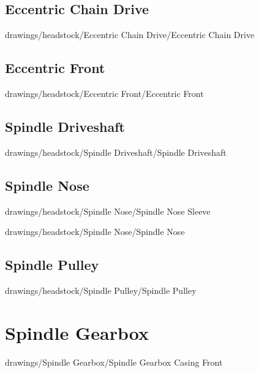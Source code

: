 \subsection{Eccentric Chain Drive}


{drawings/headstock/Eccentric Chain Drive/Eccentric Chain Drive}

\subsection{Eccentric Front}


{drawings/headstock/Eccentric Front/Eccentric Front}

\subsection{Spindle Driveshaft}


{drawings/headstock/Spindle Driveshaft/Spindle Driveshaft}

\subsection{Spindle Nose}


{drawings/headstock/Spindle Nose/Spindle Nose Sleeve}


{drawings/headstock/Spindle Nose/Spindle Nose}

\subsection{Spindle Pulley}


{drawings/headstock/Spindle Pulley/Spindle Pulley}

\section{Spindle Gearbox}


{drawings/Spindle Gearbox/Spindle Gearbox Casing Front}

